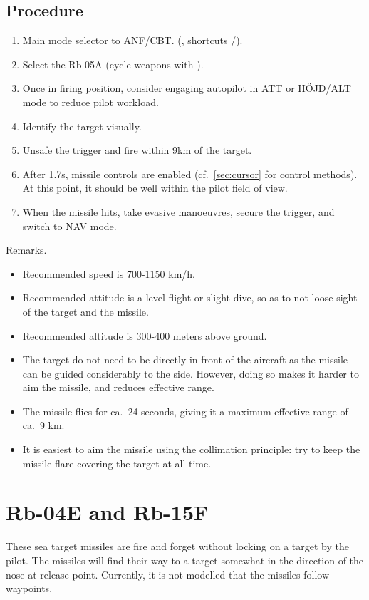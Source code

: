 \subsection{Procedure}
\begin{enumerate}
  \item Main mode selector to ANF/CBT.
    (, shortcuts /).
  \item Select the Rb 05A (cycle weapons with ).
  \item Once in firing position, consider engaging autopilot in ATT or HÖJD/ALT mode to reduce pilot workload.
  \item Identify the target visually.
  \item Unsafe the trigger and fire within 9km of the target.
  \item After 1.7s, missile controls are enabled
    (cf.\ \cref{sec:cursor} for control methods).
    At this point, it should be well within the pilot field of view.
  \item When the missile hits, take evasive manoeuvres, secure the trigger, and switch to NAV mode.
\end{enumerate}

Remarks.
\begin{itemize}
  \item Recommended speed is 700-1150 km/h.
  \item Recommended attitude is a level flight or slight dive,
    so as to not loose sight of the target and the missile.
  \item Recommended altitude is 300-400 meters above ground.
  \item The target do not need to be directly in front of the aircraft
    as the missile can be guided considerably to the side.
    However, doing so makes it harder to aim the missile, and reduces effective range.
  \item The missile flies for ca.\ 24 seconds, giving it a maximum effective range of ca.\ 9 km.
  \item It is easiest to aim the missile using the collimation principle:
    try to keep the missile flare covering the target at all time.
\end{itemize}

\section{Rb-04E and Rb-15F}
These sea target missiles are fire and forget without locking on a target by the pilot. The missiles will find their way to a target somewhat in the direction of the nose at release point. Currently, it is not modelled that the missiles follow waypoints.

